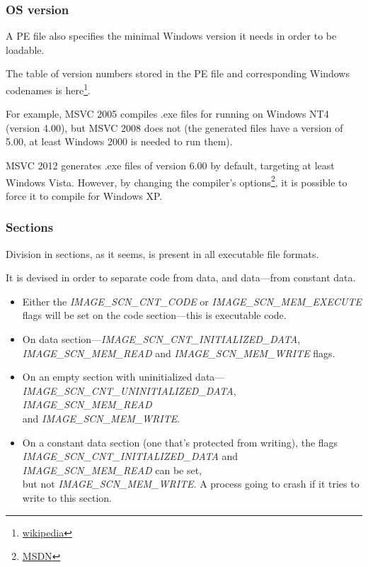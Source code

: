 \subsubsection{OS version}

A PE file also specifies the minimal Windows version it needs in order to be loadable.

The table of version numbers stored in the PE file and corresponding Windows codenames is
here\footnote{\href{http://go.yurichev.com/17044}{wikipedia}}.

For example, \ac{MSVC} 2005 compiles .exe files for running on Windows NT4 (version 4.00), but \ac{MSVC} 2008 does not
(the generated files have a version of 5.00, at least Windows 2000 is needed to run them).


\ac{MSVC} 2012 generates .exe files of version 6.00 by default,
targeting at least Windows Vista.
However, by changing the compiler's options\footnote{\href{http://go.yurichev.com/17045}{MSDN}},
it is possible to force it to compile for Windows XP.

\subsubsection{Sections}

Division in sections, as it seems, is present in all executable file formats.

It is devised in order to separate code from data, and data---from constant data.

\begin{itemize}
\item Either the \emph{IMAGE\_SCN\_CNT\_CODE} or \emph{IMAGE\_SCN\_MEM\_EXECUTE} flags will be set on the code section---this is executable code.

\item On data section---\emph{IMAGE\_SCN\_CNT\_INITIALIZED\_DATA},\\
\emph{IMAGE\_SCN\_MEM\_READ} and \emph{IMAGE\_SCN\_MEM\_WRITE} flags.

\item On an empty section with uninitialized data---\\
\emph{IMAGE\_SCN\_CNT\_UNINITIALIZED\_DATA}, \emph{IMAGE\_SCN\_MEM\_READ} \\
        and \emph{IMAGE\_SCN\_MEM\_WRITE}.

\item On a constant data section (one that's protected from writing), the flags \\
\emph{IMAGE\_SCN\_CNT\_INITIALIZED\_DATA} and \emph{IMAGE\_SCN\_MEM\_READ} can be set, \\
but not \emph{IMAGE\_SCN\_MEM\_WRITE}.
A process going to crash if it tries to write to this section.
\end{itemize}

